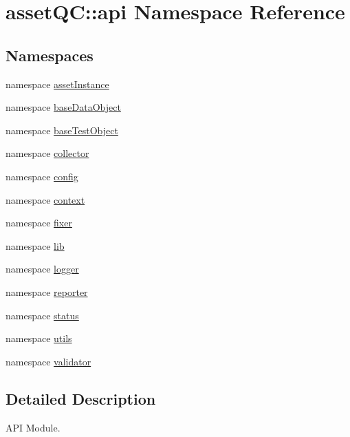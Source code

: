 \hypertarget{namespaceassetQC_1_1api}{\section{asset\-Q\-C\-:\-:api \-Namespace \-Reference}
\label{dc/d25/namespaceassetQC_1_1api}
}
\subsection*{\-Namespaces}
\begin{DoxyCompactItemize}
\item 
namespace \hyperlink{namespaceassetQC_1_1api_1_1assetInstance}{asset\-Instance}
\item 
namespace \hyperlink{namespaceassetQC_1_1api_1_1baseDataObject}{base\-Data\-Object}
\item 
namespace \hyperlink{namespaceassetQC_1_1api_1_1baseTestObject}{base\-Test\-Object}
\item 
namespace \hyperlink{namespaceassetQC_1_1api_1_1collector}{collector}
\item 
namespace \hyperlink{namespaceassetQC_1_1api_1_1config}{config}
\item 
namespace \hyperlink{namespaceassetQC_1_1api_1_1context}{context}
\item 
namespace \hyperlink{namespaceassetQC_1_1api_1_1fixer}{fixer}
\item 
namespace \hyperlink{namespaceassetQC_1_1api_1_1lib}{lib}
\item 
namespace \hyperlink{namespaceassetQC_1_1api_1_1logger}{logger}
\item 
namespace \hyperlink{namespaceassetQC_1_1api_1_1reporter}{reporter}
\item 
namespace \hyperlink{namespaceassetQC_1_1api_1_1status}{status}
\item 
namespace \hyperlink{namespaceassetQC_1_1api_1_1utils}{utils}
\item 
namespace \hyperlink{namespaceassetQC_1_1api_1_1validator}{validator}
\end{DoxyCompactItemize}


\subsection{\-Detailed \-Description}
\begin{DoxyVerb}
API Module.
\end{DoxyVerb}
 
